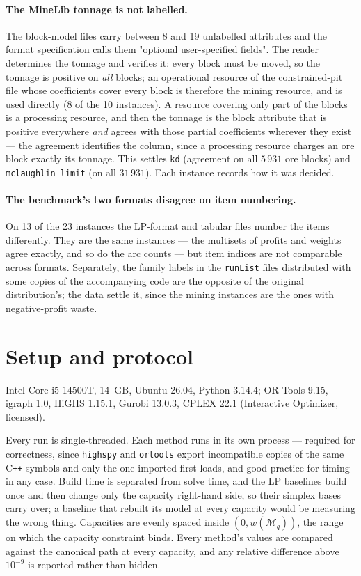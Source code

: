 \documentclass[11pt,a4paper]{article}
\newcommand{\code}[1]{\texttt{#1}}
\begin{document}
\paragraph{The MineLib tonnage is not labelled.} The block-model files carry
between 8 and 19 unlabelled attributes and the format specification calls them
"optional user-specified fields". The reader determines the tonnage and
verifies it: every block must be moved, so the tonnage is positive on
\emph{all} blocks; an operational resource of the constrained-pit file whose
coefficients cover every block is therefore the mining resource, and is used
directly (8 of the 10 instances). A resource covering only part of the blocks
is a processing resource, and then the tonnage is the block attribute that is
positive everywhere \emph{and} agrees with those partial coefficients wherever
they exist --- the agreement identifies the column, since a processing
resource charges an ore block exactly its tonnage. This settles \code{kd}
(agreement on all $5\,931$ ore blocks) and \code{mclaughlin\_limit} (on all
$31\,931$). Each instance records how it was decided.

\paragraph{The benchmark's two formats disagree on item numbering.} On 13 of
the 23 instances the LP-format and tabular files number the items
differently. They are the same instances --- the multisets of profits and
weights agree exactly, and so do the arc counts --- but item indices are not
comparable across formats. Separately, the family labels in the
\code{runList} files distributed with some copies of the accompanying code
are the opposite of the original distribution's; the data settle it, since
the mining instances are the ones with negative-profit waste.

\section{Setup and protocol}
\label{sec:setup}

Intel Core i5-14500T, 14~GB, Ubuntu 26.04, Python 3.14.4; OR-Tools 9.15,
igraph 1.0, HiGHS 1.15.1, Gurobi 13.0.3, CPLEX 22.1 (Interactive Optimizer,
licensed).

Every run is single-threaded. Each method runs in its own process --- required
for correctness, since \code{highspy} and \code{ortools} export incompatible
copies of the same C\texttt{++} symbols and only the one imported first
loads, and good practice for timing in any case. Build time is separated from
solve time, and the LP baselines build once and then change only the capacity
right-hand side, so their simplex bases carry over; a baseline that rebuilt
its model at every capacity would be measuring the wrong thing. Capacities
are evenly spaced inside $(0,w(\mathcal M_q))$, the range on which the
capacity constraint binds. Every method's values are compared against the
canonical path at every capacity, and any relative difference above $10^{-9}$
is reported rather than hidden.
\end{document}
